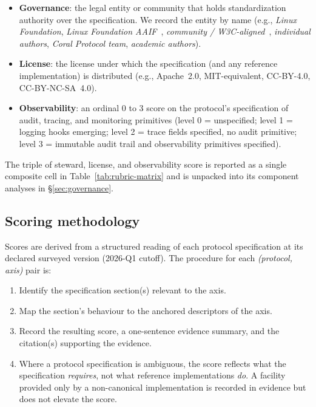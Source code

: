 \begin{itemize}
  \item \textbf{Governance}: the legal entity or
    community that holds standardization authority over
    the specification. We record the entity by name
    (e.g., \emph{Linux Foundation}, \emph{Linux
    Foundation AAIF}~\cite{lf_aaif},
    \emph{community / W3C-aligned}~\cite{w3c_agent_protocol_cg},
    \emph{individual authors}, \emph{Coral Protocol team},
    \emph{academic authors}).
  \item \textbf{License}: the license under which the
    specification (and any reference implementation) is
    distributed (e.g., Apache~2.0, MIT-equivalent,
    CC-BY-4.0, CC-BY-NC-SA~4.0).
  \item \textbf{Observability}: an ordinal 0 to 3 score on
    the protocol's specification of audit, tracing, and
    monitoring primitives (level 0 = unspecified;
    level 1 = logging hooks emerging; level 2 = trace
    fields specified, no audit primitive; level 3 =
    immutable audit trail and observability primitives
    specified).
\end{itemize}

The triple of steward, license, and observability score
is reported as a single composite cell in
Table~\ref{tab:rubric-matrix} and is unpacked into its
component analyses in \S\ref{sec:governance}.

\subsection{Scoring methodology}
\label{sec:rubric:method}

Scores are derived from a structured reading of each
protocol specification at its declared surveyed version
(2026-Q1 cutoff). The procedure for each
\emph{(protocol, axis)} pair is:

\begin{enumerate}
  \item Identify the specification section(s) relevant to
    the axis.
  \item Map the section's behaviour to the anchored
    descriptors of the axis.
  \item Record the resulting score, a one-sentence
    evidence summary, and the citation(s) supporting the
    evidence.
  \item Where a protocol specification is ambiguous, the
    score reflects what the specification \emph{requires},
    not what reference implementations \emph{do}. A
    facility provided only by a non-canonical
    implementation is recorded in evidence but does not
    elevate the score.
\end{enumerate}

